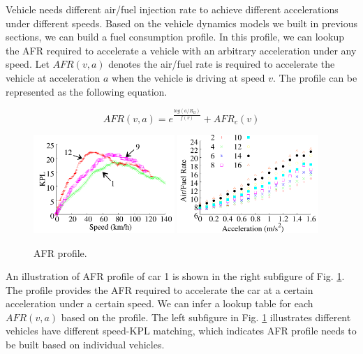 Vehicle needs different air/fuel injection rate to achieve
different accelerations under different speeds. 
Based on the vehicle dynamics models we built in 
previous sections, we can build a fuel consumption profile. 
In this profile, we can lookup the AFR required to accelerate
a vehicle with an arbitrary acceleration under any speed. 
Let $AFR(v, a)$ denotes the air/fuel rate is required to 
accelerate the vehicle at acceleration $a$ when the vehicle
is driving at speed $v$. 
The profile can be represented as the following equation. 


\begin{equation}
AFR(v, a) = e^{\frac{log(a/R_G)}{f(v)}} + AFR_c(v)
\end{equation}


\begin{figure}[!htbp]
\begin{center}
\includegraphics[width=2.1in,angle=0]{Figs/EcoDrive/speed_kpl.pdf}
\hspace{-0.4cm}
\includegraphics[width=2.1in,angle=0]{Figs/EcoDrive/acce_afr.pdf}
\hspace{-0.4cm}
\vspace{-0.3cm}
\caption{AFR profile.}
\vspace{-0.5cm}
\label{profile}
\end{center}
\end{figure}

An illustration of AFR profile of car 1 is shown in
the right subfigure of Fig. \ref{profile}. 
The profile provides the AFR required to accelerate the car
at a certain acceleration under a certain speed. 
We can infer a lookup table for each $AFR(v, a)$ based
on the profile. 
The left subfigure in Fig. \ref{profile} illustrates different
vehicles have different speed-KPL matching, 
which indicates AFR profile needs to be built
based on individual vehicles. 




 



